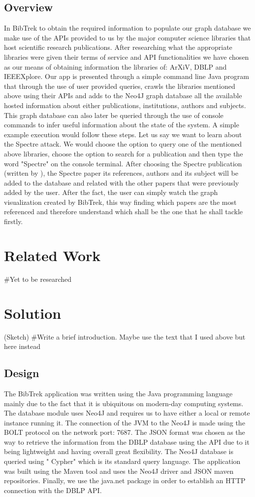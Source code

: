 \documentclass{article}
\begin{document}
\subsection{Overview}
In BibTrek to obtain the required information to populate our graph database we make use of the APIs provided to us by the major computer science libraries that host scientific research publications. After researching what the appropriate libraries were given their terms of service and API functionalities we have chosen as our means of obtaining information the libraries of: ArXiV, DBLP and IEEEXplore. Our app is presented through a simple command line Java program that through the use of user provided queries, crawls the libraries mentioned above using their APIs and adds to the Neo4J graph database all the available hosted information about either publications, institutions, authors and subjects. This graph database can also later be queried through the use of console commands to infer useful information about the state of the system. A simple example execution would follow these steps. Let us say we want to learn about the Spectre attack. We would choose the option to query one of the mentioned above libraries, choose the option to search for a publication and then type the word "Spectre" on the console terminal. After choosing the Spectre publication (written by ), the Spectre paper its references, authors and its subject will be added to the database and related with the other papers that were previously added by the user. After the fact, the user can simply watch the graph visualization created by BibTrek, this way finding which papers are the most referenced and therefore understand which shall be the one that he shall tackle firstly.

\section{Related Work}
#Yet to be researched

\section{Solution}
(Sketch)
#Write a brief introduction. Maybe use the text that I used above but here instead
\subsection{Design}
The BibTrek application was written using the Java programming language mainly due to the fact that it is ubiquitous on modern-day computing systems. The database module uses Neo4J and requires us to have either a local or remote instance running it. The connection of the JVM to the Neo4J is made using the BOLT protocol on the network port: 7687. The JSON format was chosen as the way to retrieve the information from the DBLP database using the API due to it being lightweight and having overall great flexibility. The Neo4J database is queried using "
Cypher" which is its standard query language. The application was built using the Maven tool and uses the Neo4J driver and JSON maven repositories. Finally, we use the java.net package in order to establish an HTTP connection with the DBLP API.
\end{document}
